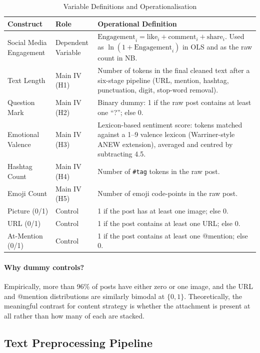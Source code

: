 \documentclass[12pt,a4paper]{article}
\begin{document}
\begin{table}[H]
\centering
\caption{Variable Definitions and Operationalisation}
\small
\begin{tabular}{@{}p{} p{} p{}@{}}
\toprule
Construct & Role & Operational Definition \\
\midrule
Social Media Engagement & Dependent Variable & $\text{Engagement}_i = \text{like}_i + \text{comment}_i + \text{share}_i$. Used as $\ln(1+\text{Engagement}_i)$ in OLS and as the raw count in NB. \\
\midrule
Text Length & Main IV (H1) & Number of tokens in the final cleaned text after a six-stage pipeline (URL, mention, hashtag, punctuation, digit, stop-word removal). \\
Question Mark & Main IV (H2) & Binary dummy: 1 if the raw post contains at least one ``?''; else 0. \\
Emotional Valence & Main IV (H3) & Lexicon-based sentiment score: tokens matched against a 1--9 valence lexicon (Warriner-style ANEW extension), averaged and centred by subtracting 4.5. \\
Hashtag Count & Main IV (H4) & Number of \texttt{\#tag} tokens in the raw post. \\
Emoji Count & Main IV (H5) & Number of emoji code-points in the raw post. \\
\midrule
Picture (0/1) & Control & 1 if the post has at least one image; else 0. \\
URL (0/1) & Control & 1 if the post contains at least one URL; else 0. \\
At-Mention (0/1) & Control & 1 if the post contains at least one @mention; else 0. \\
\bottomrule
\end{tabular}
\end{table}

\paragraph{Why dummy controls?} Empirically, more than 96\% of posts have either zero or one image, and the URL and @mention distributions are similarly bimodal at $\{0, 1\}$. Theoretically, the meaningful contrast for content strategy is whether the attachment is present at all rather than how many of each are stacked.

\subsection{Text Preprocessing Pipeline}
\label{sec:preproc}
\end{document}
